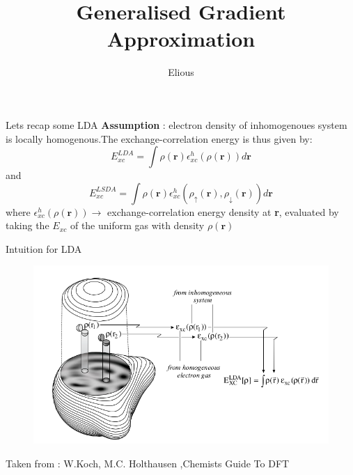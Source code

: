 \documentclass{beamer}
\title{Generalised Gradient Approximation}
\author{Elious}
\date{}
\begin{document}
	\begin{frame}
	\titlepage
	\end{frame}
	\begin{frame}[t]{Lets recap some LDA}
	\textbf{Assumption} : electron density of inhomogenoues system is locally homogenous.The exchange-correlation energy is thus given by: 
	\begin{equation}\label{eq:1}
	E_{xc}^{LDA} = \displaystyle{\int }\rho(\textbf{r})\epsilon_{xc}^{h}(\rho(\textbf{r}))d\textbf{r}
	\end{equation}
	and 
	\begin{equation}\label{eq:2}
	E_{xc}^{LSDA} = \displaystyle{\int }\rho(\textbf{r})\epsilon_{xc}^{h}(\rho_{\uparrow}(\textbf{r}),\rho_{\downarrow}(\textbf{r}))d\textbf{r}
	\end{equation}
	where
	$\epsilon_{xc}^{h}(\rho(\textbf{r})) \rightarrow$ exchange-correlation energy density at \textbf{r}, evaluated by taking the $E_{xc}$ of the uniform gas with density $\rho(\textbf{r})$
	\end{frame}
	
	\begin{frame}[t]{Intuition for LDA}
	\begin{figure}
	\centering
	\includegraphics[scale=0.40]{LDA_intuition.png}
	\end{figure}
	Taken from : W.Koch, M.C. Holthausen ,Chemists Guide To DFT
	\end{frame}		
	
\end{document}
